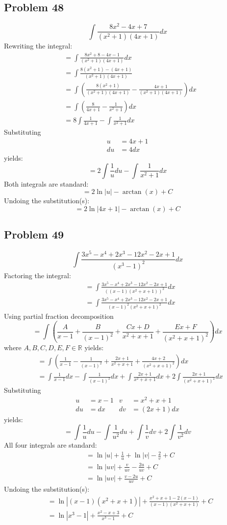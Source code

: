\documentclass{article}
\begin{document}
\subsection*{Problem 48}
$$\int\frac{8x^2-4x+7}{\left(x^2+1\right)\left(4x+1\right)}dx$$
Rewriting the integral:
\begin{align*}
&=\int\frac{8x^2+8-4x-1}{(x^2+1)(4x+1)}dx \\
&=\int\frac{8(x^2+1)-(4x+1)}{(x^2+1)(4x+1)} \\
&=\int\left(\frac{8(x^2+1)}{(x^2+1)(4x+1)}-\frac{4x+1}{(x^2+1)(4x+1)}\right)dx \\
&=\int\left(\frac{8}{4x+1}-\frac{1}{x^2+1}\right)dx \\
&=8\int\frac{1}{4x+1}-\int\frac{1}{x^2+1}dx
\end{align*}
Substituting
\begin{align*}
u&=4x+1 \\
du&=4dx
\end{align*}
yields:
$$=2\int\frac{1}{u}du-\int\frac{1}{x^2+1}dx$$
Both integrals are standard:
$$=2\ln|u|-\arctan(x)+C$$
Undoing the substitution(s):
$$=2\ln|4x+1|-\arctan(x)+C$$
\subsection*{Problem 49}
$$\int\frac{3x^5-x^4+2x^3-12x^2-2x+1}{\left(x^3-1\right)^2}dx$$
Factoring the integral:
\begin{align*}
&=\int\frac{3x^5-x^4+2x^3-12x^2-2x+1}{((x-1)(x^2+x+1))^2}dx \\
&=\int\frac{3x^5-x^4+2x^3-12x^2-2x+1}{(x-1)^2(x^2+x+1)^2}dx
\end{align*}
Using partial fraction decomposition
$$=\int\left(\frac{A}{x-1}+\frac{B}{(x-1)^2}+\frac{Cx+D}{x^2+x+1}+\frac{Ex+F}{(x^2+x+1)^2}\right)dx$$
where $A,B,C,D,E,F\in\mathbb{R}$ yields:
\begin{align*}
&=\int\left(\frac{1}{x-1}-\frac{1}{(x-1)^2}+\frac{2x+1}{x^2+x+1}+\frac{4x+2}{(x^2+x+1)^2}\right)dx \\
&=\int\frac{1}{x-1}dx-\int\frac{1}{(x-1)^2}dx+\int\frac{2x+1}{x^2+x+1}dx+2\int\frac{2x+1}{(x^2+x+1)^2}dx
\end{align*}
Substituting
\begin{align*}
u&=x-1 &v&=x^2+x+1 \\
du&=dx &dv&=(2x+1)dx
\end{align*}
yields:
$$=\int\frac{1}{u}du-\int\frac{1}{u^2}du+\int\frac{1}{v}dv+2\int\frac{1}{v^2}dv$$
All four integrals are standard:
\begin{align*}
&=\ln|u|+\frac{1}{u}+\ln|v|-\frac{2}{v}+C \\
&=\ln|uv|+\frac{v}{uv}-\frac{2u}{uv}+C \\
&=\ln|uv|+\frac{v-2u}{uv}+C
\end{align*}
Undoing the substitution(s):
\begin{align*}
&=\ln|(x-1)(x^2+x+1)|+\frac{x^2+x+1-2(x-1)}{(x-1)(x^2+x+1)}+C \\
&=\ln\left|x^3-1\right|+\frac{x^2-x+3}{x^3-1}+C
\end{align*}
\end{document}
